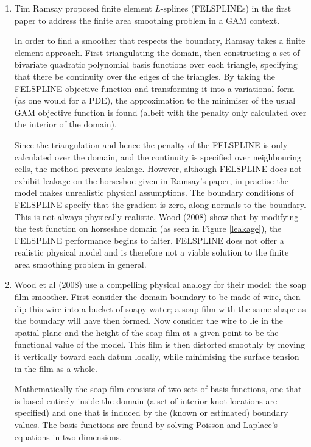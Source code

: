 \documentclass[useAMS, referee]{biom}
\begin{document}
\begin{enumerate}
\item Tim Ramsay proposed finite element $L$-splines (FELSPLINEs) in the first paper to address the finite area smoothing problem in a GAM context.

In order to find a smoother that respects the boundary, Ramsay takes a finite element approach. First triangulating the domain, then constructing a set of bivariate quadratic polynomial basis functions over each triangle, specifying that there be continuity over the edges of the triangles. By taking the FELSPLINE objective function and transforming it into a variational form (as one would for a PDE), the approximation to the minimiser of the usual GAM objective function is found (albeit with the penalty only calculated over the interior of the domain).

Since the triangulation and hence the penalty of the FELSPLINE is only calculated over the domain, and the continuity is specified over neighbouring cells, the method prevents leakage. However, although FELSPLINE does not exhibit leakage on the horseshoe given in Ramsay's paper, in practise the model makes unrealistic physical assumptions. The boundary conditions of FELSPLINE specify that the gradient is zero, along normals to the boundary. This is not always physically realistic. Wood (2008) show that by modifying the test function on horseshoe domain (as seen in Figure \ref{leakage}), the FELSPLINE performance begins to falter. FELSPLINE does not offer a realistic physical model and is therefore not a viable solution to the finite area smoothing problem in general.

\item Wood et al (2008) use a compelling physical analogy for their model: the soap film smoother. First consider the domain boundary to be made of wire, then dip this wire into a bucket of soapy water; a soap film with the same shape as the boundary will have then formed. Now consider the wire to lie in the spatial plane and the height of the soap film at a given point to be the functional value of the model. This film is then distorted smoothly by moving it vertically toward each datum locally, while minimising the surface tension in the film as a whole. 

Mathematically the soap film consists of two sets of basis functions, one that is based entirely inside the domain (a set of interior knot locations are specified) and one that is induced by the (known or estimated) boundary values. The basis functions are found by solving Poisson and Laplace's equations in two dimensions.


\end{enumerate}
\end{document}
